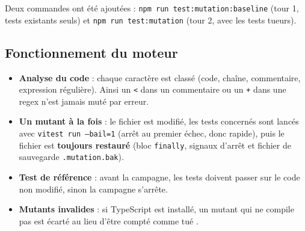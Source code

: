 \documentclass[12pt,a4paper]{article}
\begin{document}
Deux commandes ont été ajoutées : \texttt{npm run test:mutation:baseline} (tour 1, tests existants seuls) et \texttt{npm run test:mutation} (tour 2, avec les tests tueurs).

\subsection{Fonctionnement du moteur}
\begin{itemize}
    \item \textbf{Analyse du code} : chaque caractère est classé (code, chaîne, commentaire, expression régulière). Ainsi un \texttt{<} dans un commentaire ou un \texttt{+} dans une regex n'est jamais \og muté \fg{} par erreur.
    \item \textbf{Un mutant à la fois} : le fichier est modifié, les tests concernés sont lancés avec \texttt{vitest run --bail=1} (arrêt au premier échec, donc rapide), puis le fichier est \textbf{toujours restauré} (bloc \texttt{finally}, signaux d'arrêt et fichier de sauvegarde \texttt{.mutation.bak}).
    \item \textbf{Test de référence} : avant la campagne, les tests doivent passer sur le code non modifié, sinon la campagne s'arrête.
    \item \textbf{Mutants invalides} : si TypeScript est installé, un mutant qui ne compile pas est écarté au lieu d'être compté comme \og tué \fg{}.
\end{itemize}
\end{document}

